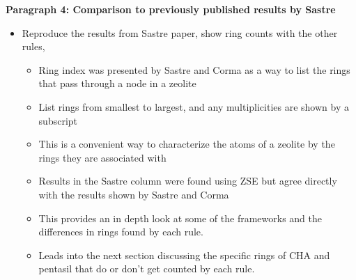 \documentclass[11pt]{article}
\begin{document}
\textbf{\textbf{Paragraph 4: Comparison to previously published results by Sastre}}
\begin{itemize}
\item Reproduce the results from Sastre paper, show ring counts with the other rules, 
\begin{itemize}
\item Ring index was presented by Sastre and Corma as a way to list the rings that pass through a node in a zeolite \cite{sastre-topological-2009}
\item List rings from smallest to largest, and any multiplicities are shown by a subscript
\item This is a convenient way to characterize the atoms of a zeolite by the rings they are associated with
\item Results in the Sastre column were found using ZSE but agree directly with the results shown by Sastre and Corma \cite{sastre-topological-2009}
\item This provides an in depth look at some of the frameworks and the differences in rings found by each rule.
\item Leads into the next section discussing the specific rings of CHA and pentasil that do or don't get counted by each rule.
\end{itemize}
\end{itemize}
\end{document}
